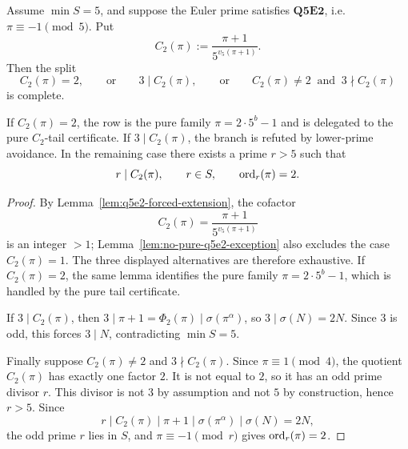 \begin{proposition}
\label{prop:q5e2-second-level-split}
Assume \(\min S=5\), and suppose the Euler prime satisfies
\(\mathbf{Q5E2}\), i.e. \(\pi\equiv-1\pmod5\).
Put
\[
  C_2(\pi):=\frac{\pi+1}{5^{v_5(\pi+1)}}.
\]
Then the split
\[
  C_2(\pi)=2,
  \qquad\text{or}\qquad
  3\mid C_2(\pi),
  \qquad\text{or}\qquad
  C_2(\pi)\ne2\ \text{ and }\ 3\nmid C_2(\pi)
\]
is complete.

If \(C_2(\pi)=2\), the row is the pure family
\(\pi=2\cdot5^b-1\) and is delegated to the pure \(C_2\)-tail certificate.  If
\(3\mid C_2(\pi)\), the branch is refuted by lower-prime avoidance.  In the
remaining case there exists a prime \(r>5\) such that
\[
  r\mid C_2(\pi),\qquad r\in S,\qquad \operatorname{ord}_r(\pi)=2.
\]
\end{proposition}

\begin{proof}
By Lemma~\ref{lem:q5e2-forced-extension}, the cofactor
\[
  C_2(\pi)=\frac{\pi+1}{5^{v_5(\pi+1)}}
\]
is an integer \(>1\); Lemma~\ref{lem:no-pure-q5e2-exception} also excludes the
case \(C_2(\pi)=1\).  The three displayed alternatives are therefore
exhaustive.  If \(C_2(\pi)=2\), the same lemma identifies the pure family
\(\pi=2\cdot5^b-1\), which is handled by the pure tail certificate.

If \(3\mid C_2(\pi)\), then
\(3\mid\pi+1=\Phi_2(\pi)\mid\sigma(\pi^\alpha)\), so
\(3\mid\sigma(N)=2N\).  Since \(3\) is odd, this forces \(3\mid N\),
contradicting \(\min S=5\).

Finally suppose \(C_2(\pi)\ne2\) and \(3\nmid C_2(\pi)\).  Since
\(\pi\equiv1\pmod4\), the quotient \(C_2(\pi)\) has exactly one factor \(2\).
It is not equal to \(2\), so it has an odd prime divisor \(r\).  This divisor
is not \(3\) by assumption and not \(5\) by construction, hence \(r>5\).  Since
\[
  r\mid C_2(\pi)\mid \pi+1\mid\sigma(\pi^\alpha)\mid\sigma(N)=2N,
\]
the odd prime \(r\) lies in \(S\), and \(\pi\equiv-1\pmod r\) gives
\(\operatorname{ord}_r(\pi)=2\).
\end{proof}

